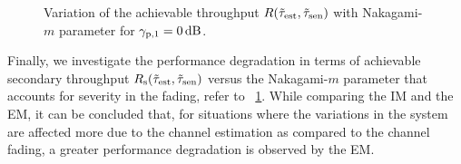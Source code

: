 {\begin{figure}[!t]
\caption{Variation of the achievable throughput $R(\tilde{\tau}_{\text{est}}, \tilde{\tau}_{\text{sen}})$ with Nakagami-$m$ parameter for ${\gamma}_{\text{p,1}} = \SI{0}{dB}$.} 
\label{fig:optT_m}
\vspace{-0.7cm}
\end{figure}

Finally, we investigate the performance degradation in terms of achievable secondary throughput $R_{\text{s}}(\tilde{\tau}_{\text{est}}, \tilde{\tau}_{\text{sen}})$ versus the Nakagami-$m$ parameter that accounts for severity in the fading, refer to \figurename~\ref{fig:optT_m}. While comparing the IM and the EM, it can be concluded that, for situations where the variations in the system are affected more due to the channel estimation as compared to the channel fading, a greater performance degradation is observed by the EM. 

%
%
%
%
%

}

